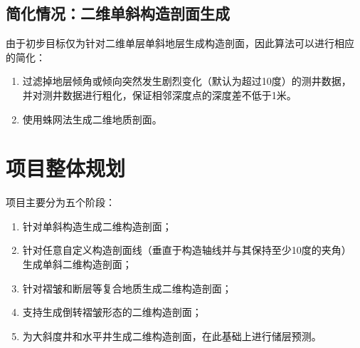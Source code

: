 \documentclass[a4paper,twoside]{ctexart}
\begin{document}
\subsection{简化情况：二维单斜构造剖面生成}

由于初步目标仅为针对二维单层单斜地层生成构造剖面，因此算法可以进行相应
的简化：
\begin{enumerate}[步骤 1:]
\item 过滤掉地层倾角或倾向突然发生剧烈变化（默认为超过10度）的测井数据，
  并对测井数据进行粗化，保证相邻深度点的深度差不低于1米。
\item 使用蛛网法生成二维地质剖面。
\end{enumerate}

\section{项目整体规划}
项目主要分为五个阶段：
\begin{enumerate}[第1阶段：]
\item 针对单斜构造生成二维构造剖面；
\item 针对任意自定义构造剖面线（垂直于构造轴线并与其保持至少10度的夹角）
  生成单斜二维构造剖面；
\item 针对褶皱和断层等复合地质生成二维构造剖面；
\item 支持生成倒转褶皱形态的二维构造剖面；
\item 为大斜度井和水平井生成二维构造剖面，在此基础上进行储层预测。
\end{enumerate}


\end{document}
